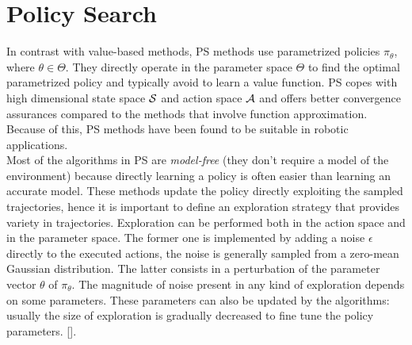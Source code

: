 \section{Policy Search}\label{sec:ps}
In contrast with value-based methods, \acf{PS} methods use parametrized policies $\pi_{\theta}$, where $\theta \in \Theta$. They directly operate in the parameter space $\Theta$ to find the optimal parametrized policy and typically avoid to learn a value function. \ac{PS} copes with high dimensional state space $\mathcal{S}$ and action space $\mathcal{A}$ and offers better convergence assurances compared to the methods that involve function approximation. Because of this, \ac{PS} methods have been found to be suitable in robotic applications.\\
\newline
Most of the algorithms in \ac{PS} are \emph{model-free} (\ie they don't require a model of the environment) because directly learning a policy is often easier than learning an accurate model. These methods update the policy directly exploiting the sampled trajectories, hence it is important to define an exploration strategy that provides variety in trajectories. Exploration can be performed both in the action space and in the parameter space. The former one is implemented by adding a noise $\epsilon$ directly to the executed actions, the noise is generally sampled from a zero-mean Gaussian distribution. The latter consists in a perturbation of the parameter vector $\theta$ of $\pi_{\theta}$. The magnitude of noise present in any kind of exploration depends on some parameters. These parameters can also be updated by the algorithms: usually the size of exploration is gradually decreased to fine tune the policy parameters. [\citet{deisenroth2013Survey}].

